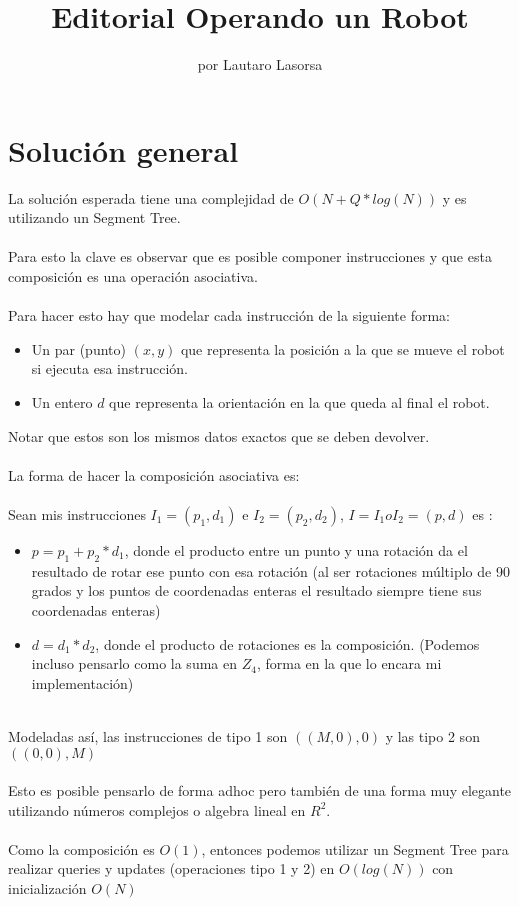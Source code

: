 \documentclass{article}
\title{Editorial Operando un Robot}
\author{por Lautaro Lasorsa}
\date{}
\begin{document}
 
\maketitle
 
\section{Solución general}
 
La solución esperada tiene una complejidad de $O(N+Q*log(N))$ y es utilizando un Segment Tree.
\\ \\Para esto la clave es observar que es posible componer instrucciones y que esta composición es una operación asociativa.\\\\
Para hacer esto hay que modelar cada instrucción de la siguiente forma:
 
\begin{itemize}
    \item Un par (punto) $(x,y)$ que representa la posición a la que se mueve el robot si ejecuta esa instrucción.
    \item Un entero $d$ que representa la orientación en la que queda al final el robot.
\end{itemize}
Notar que estos son los mismos datos exactos que se deben devolver.
\\\\La forma de hacer la composición asociativa es:
\\\\Sean mis instrucciones $I_1 = (p_1,d_1)$ e $I_2=(p_2,d_2)$, $I = I_1 o I_2 = (p,d)$ es :
\begin{itemize}
    \item $p = p_1+p_2*d_1$, donde el producto entre un punto y una rotación da el resultado de rotar ese punto con esa rotación (al ser rotaciones múltiplo de 90 grados y los puntos de coordenadas enteras el resultado siempre tiene sus coordenadas enteras)
    
    \item $d = d_1 * d_2$, donde el producto de rotaciones es la composición. (Podemos incluso pensarlo como la suma en $Z_4$, forma en la que lo encara mi implementación)
\end{itemize}
\\Modeladas así, las instrucciones de tipo 1 son $((M,0),0)$ y las tipo 2 son $((0,0),M)$
\\\\Esto es posible pensarlo de forma adhoc pero también de una forma muy elegante utilizando números complejos o algebra lineal en $R^2$.
\\\\Como la composición es $O(1)$, entonces podemos utilizar un Segment Tree para realizar queries y updates (operaciones tipo 1 y 2) en $O(log(N))$ con inicialización $O(N)$
\end{document}
